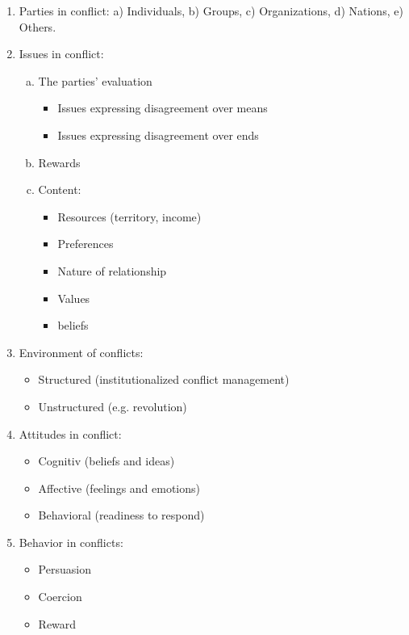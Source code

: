 \begin{enumerate}[1)]
    \item Parties in conflict: a) Individuals, b) Groups, c) Organizations,
        d) Nations, e) Others.
    \item Issues in conflict:
        \begin{enumerate}[a)]
            \item The parties' evaluation
                \begin{itemize}
                    \item Issues expressing disagreement over means
                    \item Issues expressing disagreement over ends
                \end{itemize}
            \item Rewards
            \item Content:
                \begin{itemize}
                    \item Resources (territory, income)
                    \item Preferences
                    \item Nature of relationship
                    \item Values
                    \item beliefs
                \end{itemize}
        \end{enumerate}
    \item Environment of conflicts:
        \begin{itemize}
            \item Structured (institutionalized conflict management)
            \item Unstructured (e.g. revolution)
        \end{itemize}
    \item Attitudes in conflict:
        \begin{itemize}
            \item Cognitiv (beliefs and ideas)
            \item Affective (feelings and emotions)
            \item Behavioral (readiness to respond)
        \end{itemize}
    \item Behavior in conflicts:
        \begin{itemize}
            \item Persuasion
            \item Coercion
            \item Reward
        \end{itemize}
\end{enumerate}

